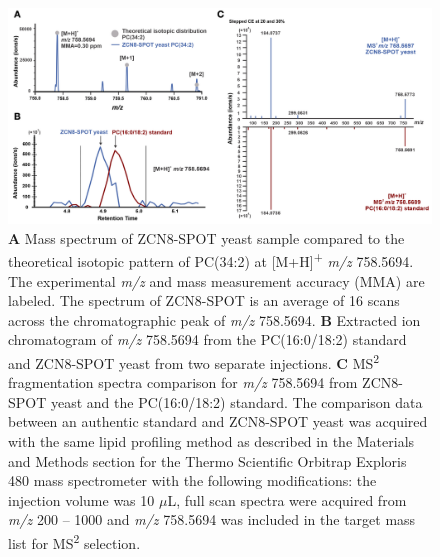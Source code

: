 \documentclass[9pt,twocolumn,twoside,lineno]{biorxiv}
\begin{document}
\begin{figure}[t]
\begin{center}
\includegraphics[width=0.8 \paperwidth]{Sup_Figures/Sup_Fig_14.png}
\caption{\textbf{A} Mass spectrum of ZCN8-SPOT yeast sample compared to the theoretical isotopic pattern of PC(34:2) at [M+H]\textsuperscript{+} \textit{m/z} 758.5694. The experimental \textit{m/z} and mass measurement accuracy (MMA) are labeled. The spectrum of ZCN8-SPOT is an average of 16 scans across the chromatographic peak of \textit{m/z} 758.5694.  
\textbf{B} Extracted ion chromatogram of \textit{m/z} 758.5694 from the PC(16:0/18:2) standard and ZCN8-SPOT yeast from two separate injections.  
\textbf{C} MS\textsuperscript{2} fragmentation spectra comparison for \textit{m/z} 758.5694 from ZCN8-SPOT yeast and the PC(16:0/18:2) standard.
The comparison data between an authentic standard and ZCN8-SPOT yeast was acquired with the same lipid profiling method as described in the Materials and Methods section for the Thermo Scientific Orbitrap Exploris 480 mass spectrometer with the following modifications:  the injection volume was 10 $\mu$L, full scan spectra were acquired from \textit{m/z} 200 – 1000 and \textit{m/z} 758.5694 was included in the target mass
list for MS\textsuperscript{2} selection.}
\label{figure:Sup:ZCN8-PC}
\end{center}
\end{figure} 

\clearpage
\end{document}
